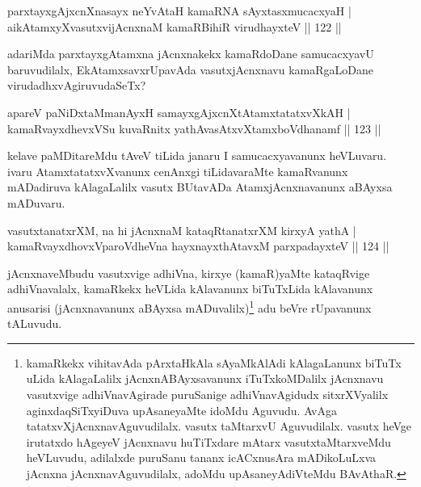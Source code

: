 
\begin{shl}
parxtayxgAjxcnXnasayx neYvAtaH kamaRNA sAyxtasxmucacxyaH |\\
aikAtamxyXvasutxvijAcnxnaM kamaRBihiR virudhayxteV \hfill || 122 ||
\end{shl}

\begin{artha}
adariMda parxtayxgAtamxna jAcnxnakekx kamaRdoDane samucacxyavU baruvudilalx, EkAtamxsavxrUpavAda vasutxjAcnxnavu kamaRgaLoDane virudadhxvAgiruvudaSeTx?
\end{artha}


\begin{shl}
apareV paNiDxtaMmanAyxH samayxgAjxcnXtAtamxtatatxvXkAH |\\
kamaRvayxdhevxVSu kuvaRnitx yathAvasAtxvXtamxboVdhanamf \hfill || 123 ||
\end{shl}

\begin{artha}
kelave paMDitareMdu tAveV tiLida janaru I samucacxyavanunx heVLuvaru. ivaru AtamxtatatxvXvanunx cenAnxgi tiLidavaraMte kamaRvanunx mADadiruva kAlagaLalilx vasutx BUtavADa AtamxjAcnxnavanunx aBAyxsa mADuvaru.
\end{artha}


\begin{shl}
vasutxtanatxrXM, na hi jAcnxnaM kataqRtanatxrXM kirxyA yathA |\\
kamaRvayxdhovxVparoVdheVna hayxnayxthAtavxM parxpadayxteV \hfill || 124 ||
\end{shl}

\begin{artha}
jAcnxnaveMbudu vasutxvige adhiVna, kirxye (kamaR)yaMte kataqRvige adhiVnavalalx, kamaRkekx heVLida kAlavanunx biTuTxLida kAlavanunx anusarisi (jAcnxnavanunx aBAyxsa mADuvalilx)\footnote[1]{kamaRkekx vihitavAda pArxtaHkAla sAyaMkAlAdi kAlagaLanunx biTuTx uLida kAlagaLalilx jAcnxnABAyxsavanunx iTuTxkoMDalilx jAcnxnavu vasutxvige adhiVnavAgirade puruSanige adhiVnavAgidudx sitxrXVyalilx aginxdaqSiTxyiDuva upAsaneyaMte idoMdu Aguvudu. AvAga tatatxvXjAcnxnavAguvudilalx. vasutx taMtarxvU Aguvudilalx. vasutx heVge irutatxdo hAgeyeV jAcnxnavu huTiTxdare mAtarx vasutxtaMtarxveMdu heVLuvudu, adilalxde puruSanu tananx icACxnusAra mADikoLuLxva jAcnxna jAcnxnavAguvudilalx, adoMdu upAsaneyAdiVteMdu BAvAthaR.} adu beVre rUpavanunx tALuvudu.
\end{artha}

